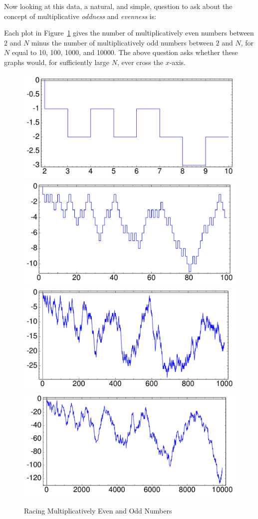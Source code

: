 \documentclass[11pt]{article}
\theoremstyle{plain}
\theoremstyle{definition}
\numberwithin{equation}{section}
\numberwithin{figure}{section}
\numberwithin{table}{section}
\begin{document}
  
   Now looking at this data, a natural, and simple, question to ask about the concept of multiplicative {\em oddness} and {\em evenness} is: 
   

Each plot in Figure~\ref{fig:liouville} gives the number of
multiplicatively even numbers between $2$ and $N$ minus the number of
multiplicatively odd numbers between $2$ and $N$, for $N$ equal to 10,
100, 1000, and 10000. The above question asks whether these graphs
would, for sufficiently large $N$, ever cross the $x$-axis.

 \begin{figure}[H]
\begin{center}
\includegraphics[width=.4\textwidth]{illustrations/liouville-10}
\includegraphics[width=.4\textwidth]{illustrations/liouville-100}\\
\includegraphics[width=.4\textwidth]{illustrations/liouville-1000}
\includegraphics[width=.4\textwidth]{illustrations/liouville-10000}\\
\caption{Racing Multiplicatively Even and Odd Numbers\label{fig:liouville}}
\end{center}
\end{figure}
  
\end{document}
